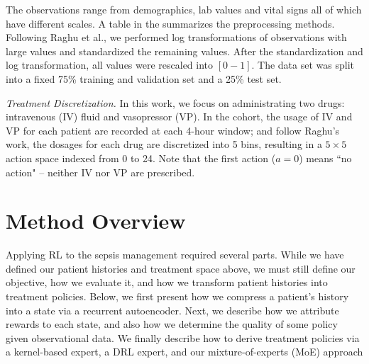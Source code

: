 \documentclass[10pt]{amia}
\begin{document}

The observations range from demographics, lab values and vital signs all of which have different scales.  A table in the  %
summarizes the preprocessing methods. Following Raghu et al., \cite{DBLP:journals/corr/RaghuKCSG17} we performed log transformations of observations with large values and standardized the remaining values. After the standardization and log transformation, all values were rescaled into $[0-1]$.  The data set was split into a fixed 75\% training and validation set and a 25\% test set. 

\textit{Treatment Discretization.} In this work, we focus on administrating two drugs: intravenous (IV) fluid and vasopressor (VP). In the cohort, the usage of IV and VP for each patient are recorded at each 4-hour window; and follow Raghu's work\cite{DBLP:journals/corr/RaghuKCSG17}, the dosages for each drug are discretized into 5 bins, resulting in a $5\times5$ action space indexed from 0 to 24. Note that the first action ($a=0$) means ``no action" -- neither IV nor VP are prescribed.

\section*{Method Overview}

Applying RL to the sepsis management required several parts.  While we have defined our patient histories and treatment space above, we must still define our objective, how we evaluate it, and how we transform patient histories into treatment policies. Below, we first present how we compress a patient's history into a state via a recurrent autoencoder.  Next, we describe how we attribute rewards to each state, and also how we determine the quality of some policy given observational data. We finally describe how to derive treatment policies via a kernel-based expert, a DRL expert, and our mixture-of-experts (MoE) approach
\end{document}
